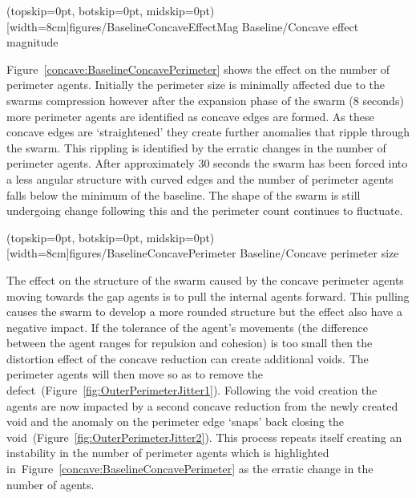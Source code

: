 \documentclass{ieeeaccess}
\begin{document}
\Figure[t!](topskip=0pt, botskip=0pt, midskip=0pt)[width=8cm]{figures/BaselineConcaveEffectMag}
{Baseline/Concave effect magnitude\label{concave:BaselineConcaveEffectMag}}


Figure~\ref{concave:BaselineConcavePerimeter} shows the effect on the number of perimeter agents. Initially the perimeter size is minimally affected due to the swarms compression however after the expansion phase of the swarm (8 seconds) more perimeter agents are identified as concave edges are formed. As these concave edges are `straightened' they create further anomalies that ripple through the swarm. This rippling is identified by the erratic changes in the number of perimeter agents. After approximately 30 seconds the swarm has been forced into a less angular structure with curved edges and the number of perimeter agents falls below the minimum of the baseline. The shape of the swarm is still undergoing change following this and the perimeter count continues to fluctuate.

\Figure[t!](topskip=0pt, botskip=0pt, midskip=0pt)[width=8cm]{figures/BaselineConcavePerimeter}
{Baseline/Concave perimeter size\label{concave:BaselineConcavePerimeter}}


The effect on the structure of the swarm caused by the concave perimeter agents moving towards the gap agents is to pull the internal agents forward. This pulling causes the swarm to develop a more rounded structure but the effect also have a negative impact. If the tolerance of the agent's movements (the difference between the agent ranges for repulsion and cohesion) is too small then the distortion effect of the concave reduction can create additional voids. The perimeter agents will then move so as to remove the defect~(Figure~\ref{fig:OuterPerimeterJitter1}). Following the void creation the agents are now impacted by a second concave reduction from the newly created void and the anomaly on the perimeter edge `snaps' back closing the void~(Figure~\ref{fig:OuterPerimeterJitter2}). This process repeats itself creating an instability in the number of perimeter agents which is highlighted in~Figure~\ref{concave:BaselineConcavePerimeter} as the erratic change in the number of agents. 
\end{document}
